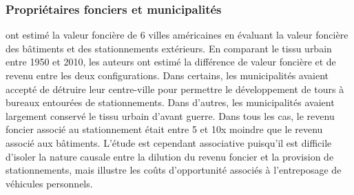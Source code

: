   \subsubsection{Propriétaires fonciers et municipalités}
  \textcite{Blanc:EffectsUrban:2014} ont estimé la valeur foncière de 6 villes américaines en évaluant la valeur foncière des bâtiments et des stationnements extérieurs. En comparant le tissu urbain entre 1950 et 2010, les auteurs ont estimé la différence de valeur foncière et de revenu entre les deux configurations. Dans certains, les municipalités avaient accepté de détruire leur centre-ville pour permettre le développement de tours à bureaux entourées de stationnements. Dans d'autres, les municipalités avaient largement conservé le tissu urbain d'avant guerre. Dans tous les cas, le revenu foncier associé au stationnement était entre 5 et 10x moindre que le revenu associé aux bâtiments. L'étude est cependant associative puisqu'il est difficile d'isoler la nature causale entre la dilution du revenu foncier et la provision de stationnements, mais illustre les coûts d'opportunité associés à l'entreposage de véhicules personnels. \par

